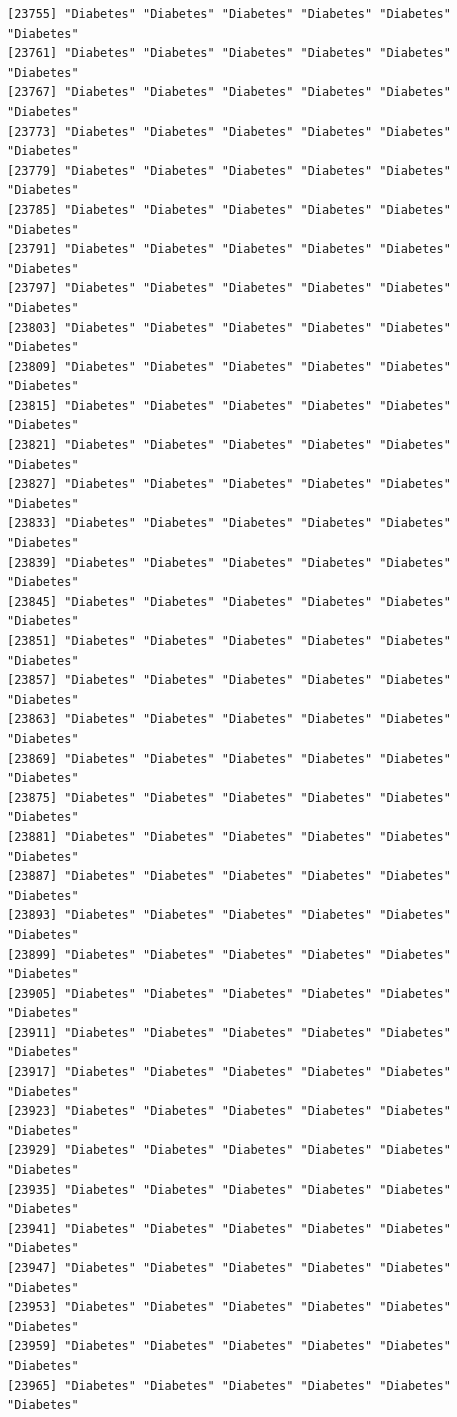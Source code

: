 \documentclass[
  letterpaper,
  DIV=11,
  numbers=noendperiod]{scrartcl}
\begin{document}
\begin{verbatim}
[23755] "Diabetes" "Diabetes" "Diabetes" "Diabetes" "Diabetes" "Diabetes"
[23761] "Diabetes" "Diabetes" "Diabetes" "Diabetes" "Diabetes" "Diabetes"
[23767] "Diabetes" "Diabetes" "Diabetes" "Diabetes" "Diabetes" "Diabetes"
[23773] "Diabetes" "Diabetes" "Diabetes" "Diabetes" "Diabetes" "Diabetes"
[23779] "Diabetes" "Diabetes" "Diabetes" "Diabetes" "Diabetes" "Diabetes"
[23785] "Diabetes" "Diabetes" "Diabetes" "Diabetes" "Diabetes" "Diabetes"
[23791] "Diabetes" "Diabetes" "Diabetes" "Diabetes" "Diabetes" "Diabetes"
[23797] "Diabetes" "Diabetes" "Diabetes" "Diabetes" "Diabetes" "Diabetes"
[23803] "Diabetes" "Diabetes" "Diabetes" "Diabetes" "Diabetes" "Diabetes"
[23809] "Diabetes" "Diabetes" "Diabetes" "Diabetes" "Diabetes" "Diabetes"
[23815] "Diabetes" "Diabetes" "Diabetes" "Diabetes" "Diabetes" "Diabetes"
[23821] "Diabetes" "Diabetes" "Diabetes" "Diabetes" "Diabetes" "Diabetes"
[23827] "Diabetes" "Diabetes" "Diabetes" "Diabetes" "Diabetes" "Diabetes"
[23833] "Diabetes" "Diabetes" "Diabetes" "Diabetes" "Diabetes" "Diabetes"
[23839] "Diabetes" "Diabetes" "Diabetes" "Diabetes" "Diabetes" "Diabetes"
[23845] "Diabetes" "Diabetes" "Diabetes" "Diabetes" "Diabetes" "Diabetes"
[23851] "Diabetes" "Diabetes" "Diabetes" "Diabetes" "Diabetes" "Diabetes"
[23857] "Diabetes" "Diabetes" "Diabetes" "Diabetes" "Diabetes" "Diabetes"
[23863] "Diabetes" "Diabetes" "Diabetes" "Diabetes" "Diabetes" "Diabetes"
[23869] "Diabetes" "Diabetes" "Diabetes" "Diabetes" "Diabetes" "Diabetes"
[23875] "Diabetes" "Diabetes" "Diabetes" "Diabetes" "Diabetes" "Diabetes"
[23881] "Diabetes" "Diabetes" "Diabetes" "Diabetes" "Diabetes" "Diabetes"
[23887] "Diabetes" "Diabetes" "Diabetes" "Diabetes" "Diabetes" "Diabetes"
[23893] "Diabetes" "Diabetes" "Diabetes" "Diabetes" "Diabetes" "Diabetes"
[23899] "Diabetes" "Diabetes" "Diabetes" "Diabetes" "Diabetes" "Diabetes"
[23905] "Diabetes" "Diabetes" "Diabetes" "Diabetes" "Diabetes" "Diabetes"
[23911] "Diabetes" "Diabetes" "Diabetes" "Diabetes" "Diabetes" "Diabetes"
[23917] "Diabetes" "Diabetes" "Diabetes" "Diabetes" "Diabetes" "Diabetes"
[23923] "Diabetes" "Diabetes" "Diabetes" "Diabetes" "Diabetes" "Diabetes"
[23929] "Diabetes" "Diabetes" "Diabetes" "Diabetes" "Diabetes" "Diabetes"
[23935] "Diabetes" "Diabetes" "Diabetes" "Diabetes" "Diabetes" "Diabetes"
[23941] "Diabetes" "Diabetes" "Diabetes" "Diabetes" "Diabetes" "Diabetes"
[23947] "Diabetes" "Diabetes" "Diabetes" "Diabetes" "Diabetes" "Diabetes"
[23953] "Diabetes" "Diabetes" "Diabetes" "Diabetes" "Diabetes" "Diabetes"
[23959] "Diabetes" "Diabetes" "Diabetes" "Diabetes" "Diabetes" "Diabetes"
[23965] "Diabetes" "Diabetes" "Diabetes" "Diabetes" "Diabetes" "Diabetes"

\end{verbatim}
\end{document}

